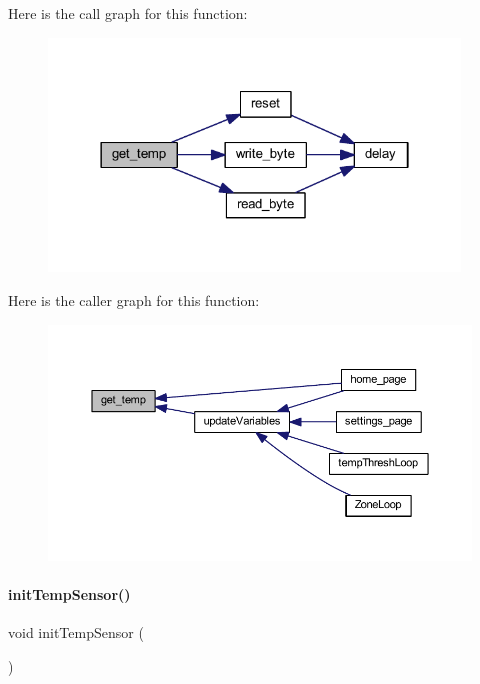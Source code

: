 Here is the call graph for this function\+:
\nopagebreak
\begin{figure}[H]
\begin{center}
\leavevmode
\includegraphics[width=310pt]{a00047_a7c1c39f9031c3ab344bbd9fa8a85479e_cgraph}
\end{center}
\end{figure}
Here is the caller graph for this function\+:
\nopagebreak
\begin{figure}[H]
\begin{center}
\leavevmode
\includegraphics[width=350pt]{a00047_a7c1c39f9031c3ab344bbd9fa8a85479e_icgraph}
\end{center}
\end{figure}
\mbox{\label{a00047_a6f113d0c9396301bb878730ed4018e44}} 
\paragraph{init\+Temp\+Sensor()}
{\footnotesize\ttfamily void init\+Temp\+Sensor (\begin{DoxyParamCaption}{ }\end{DoxyParamCaption})}

